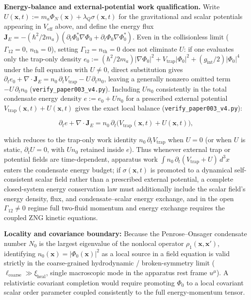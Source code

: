 \documentclass[
  american,
  11pt,
  letterpaper,
]{article}
\begin{document}
\textbf{Energy-balance and external-potential work qualification.} Write \(U(\mathbf{x}, t) := m_a\Phi_N(\mathbf{x}) + \lambda_Q\sigma(\mathbf{x}, t)\) for the gravitational and scalar potentials appearing in \(V_{\mathrm{eff}}\) above, and define the energy flux \(\mathbf{J}_E = -(\hbar^2/2m_a)(\partial_t\Phi_0^*\nabla\Phi_0 + \partial_t\Phi_0\nabla\Phi_0^*)\). Even in the collisionless limit (\(\Gamma_{12} = 0\), \(n_{\mathrm{th}} = 0\)), setting \(\Gamma_{12} = n_{\mathrm{th}} = 0\) does not eliminate \(U\): if one evaluates only the trap-only density \(e_0 := (\hbar^2/2m_a)|\nabla\Phi_0|^2 + V_{\mathrm{trap}}|\Phi_0|^2 + (g_{\mathrm{int}}/2)|\Phi_0|^4\) under the full equation with \(U \neq 0\), direct substitution gives \(\partial_t e_0 + \nabla\cdot\mathbf{J}_E = n_0\,\partial_t V_{\mathrm{trap}} - U\,\partial_t n_0\), leaving a generally nonzero omitted term \(-U\,\partial_t n_0\) (\nolinkurl{verify_paper003_v4.py}). Including \(U n_0\) consistently in the total condensate energy density \(e := e_0 + U n_0\) for a prescribed external potential \(V_{\mathrm{trap}}(\mathbf{x}, t) + U(\mathbf{x}, t)\) gives the exact local balance (\nolinkurl{verify_paper003_v4.py}):

\begin{equation}
\partial_t e + \nabla\cdot\mathbf{J}_E = n_0\,\partial_t\bigl(V_{\mathrm{trap}}(\mathbf{x}, t) + U(\mathbf{x}, t)\bigr),
\end{equation}

which reduces to the trap-only work identity \(n_0\,\partial_t V_{\mathrm{trap}}\) when \(U = 0\) (or when \(U\) is static, \(\partial_t U = 0\), with \(U n_0\) retained inside \(e\)). Thus whenever external trap or potential fields are time-dependent, apparatus work \(\int n_0\,\partial_t(V_{\mathrm{trap}} + U)\,d^3x\) enters the condensate energy budget; if \(\sigma(\mathbf{x}, t)\) is promoted to a dynamical self-consistent scalar field rather than a prescribed external potential, a complete closed-system energy conservation law must additionally include the scalar field's energy density, flux, and condensate--scalar energy exchange, and in the open \(\Gamma_{12} \neq 0\) regime full two-fluid momentum and energy exchange requires the coupled ZNG kinetic equations.

\textbf{Locality and covariance boundary:} Because the Penrose--Onsager condensate number \(N_0\) is the largest eigenvalue of the nonlocal operator \(\rho_1(\mathbf{x}, \mathbf{x}')\), identifying \(n_0(\mathbf{x}) = |\Phi_0(\mathbf{x})|^2\) as a local source in a field equation is valid strictly in the coarse-grained hydrodynamic / broken-symmetry limit (\(\ell_{\mathrm{coarse}} \gg \xi_{\mathrm{heal}}\), single macroscopic mode in the apparatus rest frame \(u^\mu\)). A relativistic covariant completion would require promoting \(\Phi_0\) to a local covariant scalar order parameter coupled consistently to the full energy-momentum tensor.
\end{document}
